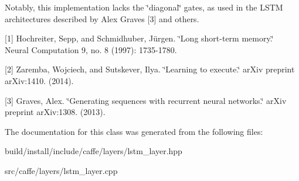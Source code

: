 Notably, this implementation lacks the \char`\"{}diagonal\char`\"{} gates, as used in the L\+S\+TM architectures described by Alex Graves \mbox{[}3\mbox{]} and others.

\mbox{[}1\mbox{]} Hochreiter, Sepp, and Schmidhuber, Jürgen. \char`\"{}\+Long short-\/term memory.\char`\"{} Neural Computation 9, no. 8 (1997)\+: 1735-\/1780.

\mbox{[}2\mbox{]} Zaremba, Wojciech, and Sutskever, Ilya. \char`\"{}\+Learning to execute.\char`\"{} ar\+Xiv preprint ar\+Xiv\+:1410. (2014).

\mbox{[}3\mbox{]} Graves, Alex. \char`\"{}\+Generating sequences with recurrent neural networks.\char`\"{} ar\+Xiv preprint ar\+Xiv\+:1308. (2013). 

The documentation for this class was generated from the following files\+:\begin{DoxyCompactItemize}
\item 
build/install/include/caffe/layers/lstm\+\_\+layer.\+hpp\item 
src/caffe/layers/lstm\+\_\+layer.\+cpp\end{DoxyCompactItemize}
